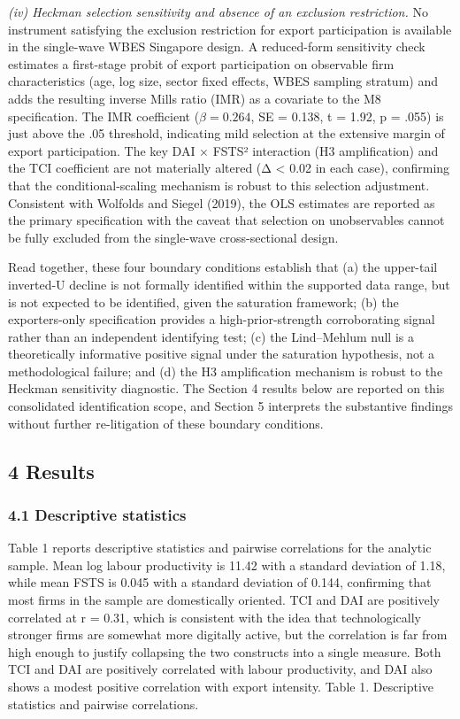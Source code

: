 \documentclass[12pt,a4paper]{article}
\begin{document}
\emph{(iv) Heckman selection sensitivity and absence of an exclusion
restriction.} No instrument satisfying the exclusion restriction for
export participation is available in the single-wave WBES Singapore
design. A reduced-form sensitivity check estimates a first-stage probit
of export participation on observable firm characteristics (age, log
size, sector fixed effects, WBES sampling stratum) and adds the
resulting inverse Mills ratio (IMR) as a covariate to the M8
specification. The IMR coefficient (\(\beta = 0.264\), SE = 0.138, t =
1.92, p = .055) is just above the .05 threshold, indicating mild
selection at the extensive margin of export participation. The key DAI ×
FSTS² interaction (H3 amplification) and the TCI coefficient are not
materially altered (\textbar Δ\textbar{} \textless{} 0.02 in each case),
confirming that the conditional-scaling mechanism is robust to this
selection adjustment. Consistent with Wolfolds and Siegel (2019), the
OLS estimates are reported as the primary specification with the caveat
that selection on unobservables cannot be fully excluded from the
single-wave cross-sectional design.

Read together, these four boundary conditions establish that (a) the
upper-tail inverted-U decline is not formally identified within the
supported data range, but is not expected to be identified, given the
saturation framework; (b) the exporters-only specification provides a
high-prior-strength corroborating signal rather than an independent
identifying test; (c) the Lind--Mehlum null is a theoretically
informative positive signal under the saturation hypothesis, not a
methodological failure; and (d) the H3 amplification mechanism is robust
to the Heckman sensitivity diagnostic. The Section 4 results below are
reported on this consolidated identification scope, and Section 5
interprets the substantive findings without further re-litigation of
these boundary conditions.

\hypertarget{4-results}{%
\subsection{4 Results}\label{4-results}}

\hypertarget{41-descriptive-statistics}{%
\subsubsection{4.1 Descriptive
statistics}\label{41-descriptive-statistics}}

Table 1 reports descriptive statistics and pairwise correlations for the
analytic sample. Mean log labour productivity is 11.42 with a standard
deviation of 1.18, while mean FSTS is 0.045 with a standard deviation of
0.144, confirming that most firms in the sample are domestically
oriented. TCI and DAI are positively correlated at r = 0.31, which is
consistent with the idea that technologically stronger firms are
somewhat more digitally active, but the correlation is far from high
enough to justify collapsing the two constructs into a single measure.
Both TCI and DAI are positively correlated with labour productivity, and
DAI also shows a modest positive correlation with export intensity.
Table 1. Descriptive statistics and pairwise correlations.
\end{document}
